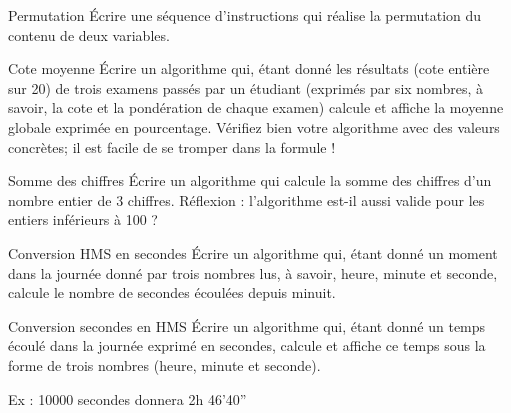 \begin{Exercice}{Permutation}
	Écrire une séquence d’instructions qui réalise la permutation du contenu
	de deux variables.
\end{Exercice}

\begin{Exercice}{Cote moyenne}
	Écrire un algorithme qui, étant donné les résultats (cote entière sur
	20) de trois examens passés par un étudiant (exprimés par six nombres,
	à savoir, la cote et la pondération de chaque examen) calcule et
	affiche la moyenne globale exprimée en pourcentage. Vérifiez bien votre
	algorithme avec des valeurs concrètes; il est facile de se tromper dans
	la formule !
\end{Exercice}

\begin{Exercice}{Somme des chiffres}
	Écrire un algorithme qui calcule la somme des chiffres
	d'un nombre entier de 3 chiffres.
	Réflexion : l’algorithme est-il aussi valide pour les entiers inférieurs
	à 100 ?
\end{Exercice}

\begin{Exercice}{Conversion HMS en secondes}
	Écrire un algorithme qui, étant donné un moment dans la journée donné
	par trois nombres lus, à savoir, heure, minute et seconde, calcule le
	nombre de secondes écoulées depuis minuit.
\end{Exercice}

\begin{Exercice}{Conversion secondes en HMS}
	Écrire un algorithme qui, étant donné un temps écoulé dans la journée
	exprimé en secondes, calcule et affiche ce temps sous la forme de trois
	nombres (heure, minute et seconde).

	Ex : 10000 secondes donnera 2h 46'40''
\end{Exercice}
